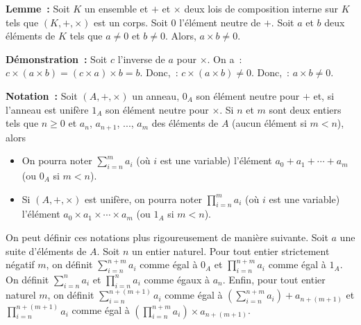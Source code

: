 \medskip

\noindent\textbf{Lemme :} Soit $K$ un ensemble et $+$ et $\times$ deux lois de composition interne sur $K$ tels que $(K, +, \times)$ est un corps. 
    Soit $0$ l'élément neutre de $+$.
    Soit $a$ et $b$ deux éléments de $K$ tels que $a \neq 0$ et $b \neq 0$.
    Alors, $a \times b \neq 0$.

\medskip

\noindent\textbf{Démonstration :} Soit $c$ l'inverse de $a$ pour $\times$.
    On a : $c \times (a \times b) = (c \times a) \times b = b$.
    Donc, : $c \times (a \times b) \neq 0$.
    Donc, : $a \times b \neq 0$.

    \done

\medskip

\noindent\textbf{Notation :} Soit $(A, +, \times)$ un anneau, $0_A$ son élément neutre pour $+$ et, si l'anneau est unifère $1_A$ son élément neutre pour $\times$.
    Si $n$ et $m$ sont deux entiers tels que $n \geq 0$ et $a_n$, $a_{n+1}$, ..., $a_m$ des éléments de $A$ (aucun élément si $m < n$), alors 
    \begin{itemize}[nosep]
        \item On pourra noter $\sum_{i=n}^m a_i$ (où $i$ est une variable) l'élément $a_0 + a_1 + \cdots + a_m$ (ou $0_A$ si $m < n$).
        \item Si $(A, +, \times)$ est unifère, on pourra noter $\prod_{i=n}^m a_i$ (où $i$ est une variable) l'élément $a_0 \times a_1 \times \cdots \times a_m$ (ou $1_A$ si $m < n$).
    \end{itemize}
    On peut définir ces notations plus rigoureusement de manière suivante. 
    Soit $a$ une suite d'éléments de $A$.
    Soit $n$ un entier naturel.
    Pour tout entier strictement négatif $m$, on définit $\sum_{i=n}^{n+m} a_i$ comme égal à $0_A$ et $\prod_{i=n}^{n+m} a_i$ comme égal à $1_A$.
    On définit $\sum_{i=n}^n a_i$ et $\prod_{i=n}^n a_i$ comme égaux à $a_n$.
    Enfin, pour tout entier naturel $m$, on définit $\sum_{i=n}^{n+(m+1)} a_i$ comme égal à $\left( \sum_{i=n}^{n+m} a_i \right) + a_{n+(m+1)}$ et $\prod_{i=n}^{n+(m+1)} a_i$ comme égal à $\left( \prod_{i=n}^{n+m} a_i \right) \times a_{n+(m+1)}$.

\medskip

